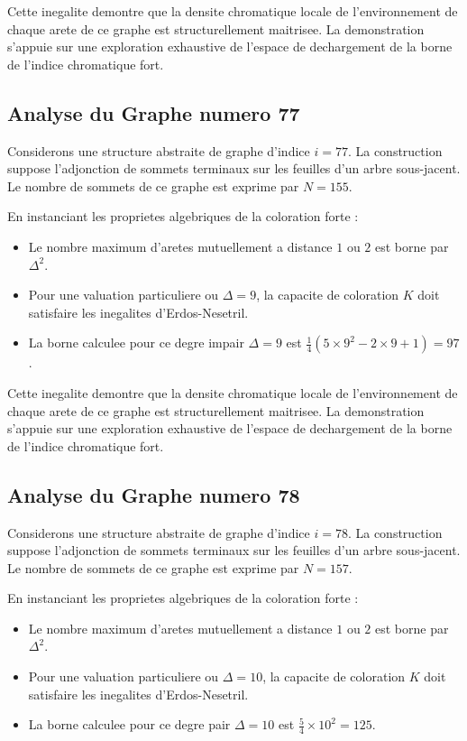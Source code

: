 \documentclass[11pt,a4paper]{article}
\begin{document}
Cette inegalite demontre que la densite chromatique locale de l'environnement de chaque arete de ce graphe est structurellement maitrisee. La demonstration s'appuie sur une exploration exhaustive de l'espace de dechargement de la borne de l'indice chromatique fort.

\subsection{Analyse du Graphe numero 77}
Considerons une structure abstraite de graphe d'indice $i = 77$. La construction suppose l'adjonction de sommets terminaux sur les feuilles d'un arbre sous-jacent. Le nombre de sommets de ce graphe est exprime par $N = 155$.

En instanciant les proprietes algebriques de la coloration forte :
\begin{itemize}
\item Le nombre maximum d'aretes mutuellement a distance $1$ ou $2$ est borne par $\Delta^2$.
\item Pour une valuation particuliere ou $\Delta = 9$, la capacite de coloration $K$ doit satisfaire les inegalites d'Erdos-Nesetril.
\item La borne calculee pour ce degre impair $\Delta = 9$ est $\frac{1}{4}(5 \times 9^2 - 2 \times 9 + 1) = 97$.
\end{itemize}

Cette inegalite demontre que la densite chromatique locale de l'environnement de chaque arete de ce graphe est structurellement maitrisee. La demonstration s'appuie sur une exploration exhaustive de l'espace de dechargement de la borne de l'indice chromatique fort.

\subsection{Analyse du Graphe numero 78}
Considerons une structure abstraite de graphe d'indice $i = 78$. La construction suppose l'adjonction de sommets terminaux sur les feuilles d'un arbre sous-jacent. Le nombre de sommets de ce graphe est exprime par $N = 157$.

En instanciant les proprietes algebriques de la coloration forte :
\begin{itemize}
\item Le nombre maximum d'aretes mutuellement a distance $1$ ou $2$ est borne par $\Delta^2$.
\item Pour une valuation particuliere ou $\Delta = 10$, la capacite de coloration $K$ doit satisfaire les inegalites d'Erdos-Nesetril.
\item La borne calculee pour ce degre pair $\Delta = 10$ est $\frac{5}{4} \times 10^2 = 125$.
\end{itemize}
\end{document}
